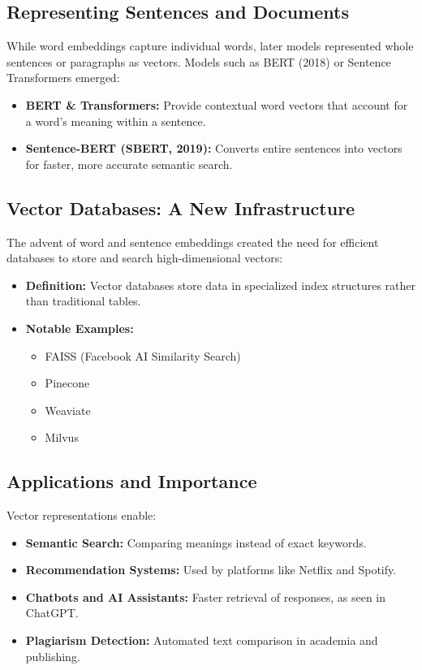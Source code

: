 \subsection{Representing Sentences and Documents}

While word embeddings capture individual words, later models represented whole sentences
or paragraphs as vectors. Models such as BERT (2018) or Sentence Transformers emerged:
\begin{itemize}
  \item \textbf{BERT \& Transformers:} Provide contextual word vectors that account for a word's
        meaning within a sentence.
  \item \textbf{Sentence-BERT (SBERT, 2019):} Converts entire sentences into vectors for faster,
        more accurate semantic search.
\end{itemize}

\subsection{Vector Databases: A New Infrastructure}

The advent of word and sentence embeddings created the need for efficient databases to store
and search high-dimensional vectors:
\begin{itemize}
  \item \textbf{Definition:} Vector databases store data in specialized index structures rather
        than traditional tables.
  \item \textbf{Notable Examples:}
    \begin{itemize}
      \item FAISS (Facebook AI Similarity Search)
      \item Pinecone
      \item Weaviate
      \item Milvus
    \end{itemize}
\end{itemize}

\subsection{Applications and Importance}

Vector representations enable:
\begin{itemize}
  \item \textbf{Semantic Search:} Comparing meanings instead of exact keywords.
  \item \textbf{Recommendation Systems:} Used by platforms like Netflix and Spotify.
  \item \textbf{Chatbots and AI Assistants:} Faster retrieval of responses, as seen in ChatGPT.
  \item \textbf{Plagiarism Detection:} Automated text comparison in academia and publishing.
\end{itemize}

